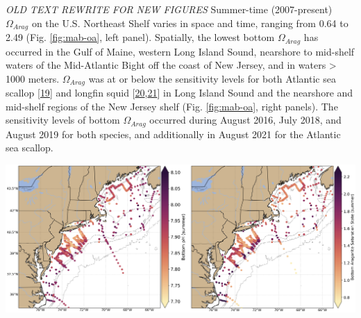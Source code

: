 \documentclass[
  10pt,
]{article}
\let\origfigure\figure
\let\endorigfigure\endfigure
\renewenvironment{figure}[1][2] {
    \expandafter\origfigure\expandafter[H]
} {
    \endorigfigure
}
\begin{document}
\emph{OLD TEXT REWRITE FOR NEW FIGURES}
Summer-time (2007-present) \(\Omega_{Arag}\) on the U.S. Northeast Shelf varies in space and time, ranging from 0.64 to 2.49 (Fig. \ref{fig:mab-oa}, left panel). Spatially, the lowest bottom \(\Omega_{Arag}\) has occurred in the Gulf of Maine, western Long Island Sound, nearshore to mid-shelf waters of the Mid-Atlantic Bight off the coast of New Jersey, and in waters \textgreater{} 1000 meters. \(\Omega_{Arag}\) was at or below the sensitivity levels for both Atlantic sea scallop {[}\protect\hyperlink{ref-cameron_effects_2022}{19}{]} and longfin squid {[}\protect\hyperlink{ref-zakroff_dose-dependence_2019}{20},\protect\hyperlink{ref-zakroff_antagonistic_2020}{21}{]} in Long Island Sound and the nearshore and mid-shelf regions of the New Jersey shelf (Fig. \ref{fig:mab-oa}, right panels). The sensitivity levels of bottom \(\Omega_{Arag}\) occurred during August 2016, July 2018, and August 2019 for both species, and additionally in August 2021 for the Atlantic sea scallop.

\begin{figure}

{\centering \includegraphics[width=1\linewidth]{SOE-NEFMC_files/figure-latex/mab-oa-1} 

}

\caption{Bottom summer-time (June-August) pH (left panel) and aragonite saturation state (right panel) on the U.S. Northeast Shelf from 2007-2023 plotted from available quality-controlled vessel- and glider-based datasets.}\label{fig:mab-oa}
\end{figure}
\end{document}
